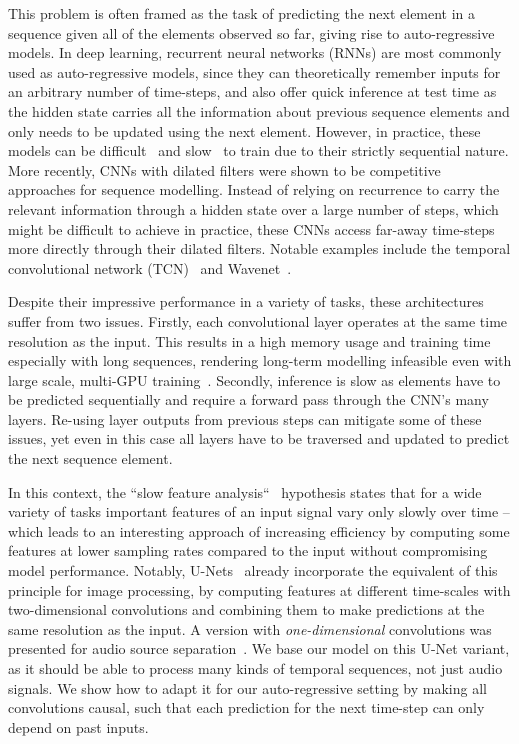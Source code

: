 \documentclass{article}
\begin{document}
This problem is often framed as the task of predicting the next element in a sequence given all of the elements observed so far, giving rise to auto-regressive models.
In deep learning, recurrent neural networks (RNNs) are most commonly used as auto-regressive models, since they can theoretically remember inputs for an arbitrary number of time-steps, and also offer quick inference at test time as the hidden state carries all the information about previous sequence elements and only needs to be updated using the next element.
However, in practice, these models can be difficult~\cite{bengioLearningLongterm1994} and slow~\cite{trinhLearningLongerterm2018} to train due to their strictly sequential nature.
More recently, CNNs with dilated filters were shown to be competitive approaches for sequence modelling.
Instead of relying on recurrence to carry the relevant information through a hidden state over a large number of steps, which might be difficult to achieve in practice, these CNNs access far-away time-steps more directly through their dilated filters.
Notable examples include the temporal convolutional network (TCN)~\cite{bai2018convolutional} and Wavenet~\cite{dielemanWaveNetGenerative2016}.

Despite their impressive performance in a variety of tasks, these architectures suffer from two issues.
Firstly, each convolutional layer operates at the same time resolution as the input.
This results in a high memory usage and training time especially with long sequences, rendering long-term modelling infeasible even with large scale, multi-GPU training~\cite{dielemanWaveNetGenerative2016}.
Secondly, inference is slow as elements have to be predicted sequentially and require a forward pass through the CNN's many layers.
Re-using layer outputs from previous steps can mitigate some of these issues, yet even in this case all layers have to be traversed and updated to predict the next sequence element.

In this context, the ``slow feature analysis``~\cite{wiskottSlowFeature2002} hypothesis states that for a wide variety of tasks important features of an input signal vary only slowly over time -- which leads to an interesting approach of increasing efficiency by computing some features at lower sampling rates compared to the input without compromising model performance.
Notably, U-Nets~\cite{ronnebergerUnetConvolutional2015} already incorporate the equivalent of this principle for image processing, by computing features at different time-scales with two-dimensional convolutions and combining them to make predictions at the same resolution as the input.
A version with \emph{one-dimensional} convolutions was presented for audio source separation~\cite{stollerWaveUNetMultiScale2018}.
We base our model on this U-Net variant, as it should be able to process many kinds of temporal sequences, not just audio signals.
We show how to adapt it for our auto-regressive setting by making all convolutions causal, such that each prediction for the next time-step can only depend on past inputs.
\end{document}
